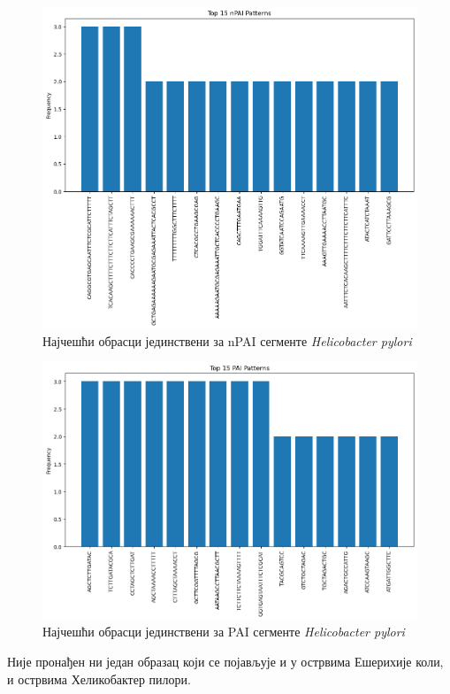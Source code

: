\documentclass[12pt]{article}
\begin{document}
\begin{figure}[h]
    \centering
    \includegraphics[width=0.8\linewidth]{images/h_pylori/top15_npai.png}
    \caption{Најчешћи обрасци јединствени за nPAI сегменте \textit{Helicobacter pylori}}
    \label{fig:top15_npai}
\end{figure}

\clearpage

\begin{figure}[htbp]
    \centering
    \includegraphics[width=0.8\linewidth]{images/h_pylori/top15_pai.png}
    \caption{Најчешћи обрасци јединствени за PAI сегменте \textit{Helicobacter pylori}}
    \vspace{0.5cm}
    \label{fig:top15_pai}
\end{figure}

Није пронађен ни један образац који се појављује и у острвима Ешерихије коли, и острвима Хеликобактер пилори.

\clearpage
\newpage

\end{document}
